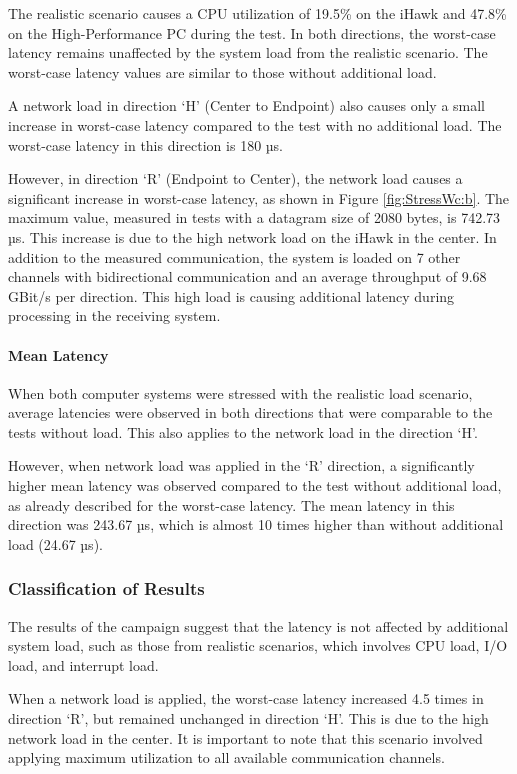 The realistic scenario causes a CPU utilization of 19.5\% on the iHawk and 47.8\% on the High-Performance PC during the test. In both directions, the worst-case latency remains unaffected by the system load from the realistic scenario. The worst-case latency values are similar to those without additional load.

A network load in direction `H' (Center to Endpoint) also causes only a small increase in worst-case latency compared to the test with no additional load. The worst-case latency in this direction is 180 µs.

However, in direction `R' (Endpoint to Center), the network load causes a significant increase in worst-case latency, as shown in Figure \ref{fig:StressWc:b}. The maximum value, measured in tests with a datagram size of 2080 bytes, is 742.73 µs. This increase is due to the high network load on the iHawk in the center. In addition to the measured communication, the system is loaded on 7 other channels with bidirectional communication and an average throughput of 9.68 GBit/s per direction. This high load is causing additional latency during processing in the receiving system.

\paragraph{Mean Latency}
When both computer systems were stressed with the realistic load scenario, average latencies were observed in both directions that were comparable to the tests without load. This also applies to the network load in the direction `H'.

However, when network load was applied in the `R' direction, a significantly higher mean latency was observed compared to the test without additional load, as already described for the worst-case latency. The mean latency in this direction was 243.67 µs, which is almost 10 times higher than without additional load (24.67 µs).

\subsubsection{Classification of Results}
The results of the campaign suggest that the latency is not affected by additional system load, such as those from realistic scenarios, which involves CPU load, I/O load, and interrupt load.

When a network load is applied, the worst-case latency increased 4.5 times in direction `R', but remained unchanged in direction `H'. This is due to the high network load in the center. It is important to note that this scenario involved applying maximum utilization to all available communication channels.

